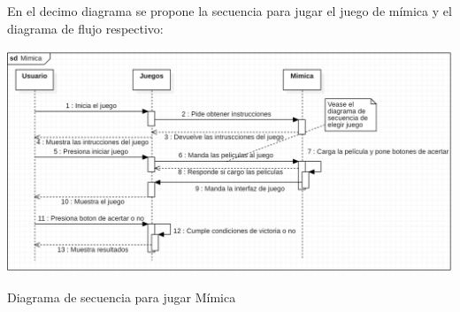 \documentclass[12pt, oneside, letterpaper]{book}
\begin{document}
\bigskip
\fontsize{14}{18}\selectfont
\par 
En el decimo diagrama se propone la secuencia para jugar el juego de mímica y el diagrama de flujo respectivo:

\begin{center}
	\centering
		\includegraphics[width=1.29\textwidth]{DSFNMimica.png}

	\caption{Diagrama de secuencia para jugar Mímica}
	\label{DSFNMimica}
\end{center}
\end{document}
